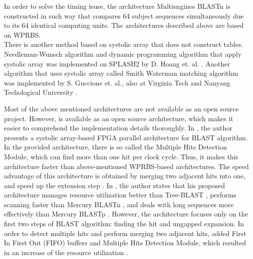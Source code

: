 In order to solve the timing isuse, the architecture Multiengines BLASTn \cite{sotiriades2007design} is constructed in such way that compares 64 subject sequences simultaneously due to its 64 identical computing units. The architectures described above are based on WPRBS.
\\

There is another method based on systolic array that does not construct tables. Needleman-Wunsch algorithm \cite{gonnet1992exhaustive} and dynamic programming algorithm that apply systolic array was implemented on SPLASH2 by D. Hoang et. al. \cite{hoang1993searching}. Another algorithm that uses systolic array called Smith Waterman matching algorithm was implemented by S. Guccione et. al., also at Virginia Tech and Nanyang Techological University \cite{yu2003smith}. 

Most of the above mentioned architectures are not available as an open source project. However, \cite{guo2012open} is available as an open source architecture, which makes it easier to comprehend the implementation details thoroughly. In \cite{guo2012open}, the author presents a systolic array-based FPGA parallel architecture for BLAST algorithm. In the provided architecture, there is so called the Multiple Hits Detection Module, which can find more than one hit per clock cycle. Thus, it makes this architecture faster than above-mentioned WPRBS-based architectures. The speed advantage of this architecture is obtained by merging two adjacent hits into one, and speed up the extension step \cite{guo2012open}. In \cite{guo2012open}, the author states that his proposed architecture manages resource utilization better than Tree-BLAST \cite{herbordt2006single}, performs scanning faster than Mercury BLASTn \cite{buhler2007mercury}, and deals with long sequences more effectively than Mercury BLASTp \cite{harris2007banded}. However, the architecture focuses only on the first two steps of BLAST algorithm: finding the hit and ungapped expansion. In order to detect multiple hits and perform merging two adjacent hits, \cite{guo2012open} added First In First Out (FIFO) buffers and Multiple Hits Detection Module, which resulted in an increase of the resource utilization \cite{guo2012open}.


